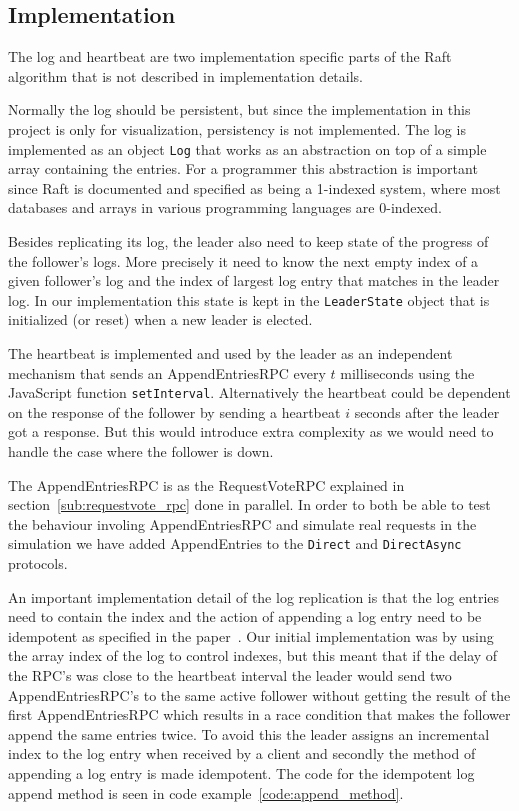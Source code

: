 \subsection{Implementation} %
\label{sub:log_replication_implementation}

The log and heartbeat are two implementation specific parts of the Raft algorithm that is not described in implementation details.

Normally the log should be persistent, but since the implementation in this project is only for visualization, persistency is not implemented. The log is implemented as an object \verb$Log$ that works as an abstraction on top of a simple array containing the entries. For a programmer this abstraction is important since Raft is documented and specified as being a 1-indexed system, where most databases and arrays in various programming languages are 0-indexed.

Besides replicating its log, the leader also need to keep state of the progress of the follower's logs. More precisely it need to know the next empty index of a given follower's log and the index of largest log entry that matches in the leader log. In our implementation this state is kept in the \verb$LeaderState$ object that is initialized (or reset) when a new leader is elected.

The heartbeat is implemented and used by the leader as an independent mechanism that sends an AppendEntriesRPC every $t$ milliseconds using the JavaScript function \verb$setInterval$. Alternatively the heartbeat could be dependent on the response of the follower by sending a heartbeat $i$ seconds after the leader got a response. But this would introduce extra complexity as we would need to handle the case where the follower is down.

The AppendEntriesRPC is as the RequestVoteRPC explained in section~\ref{sub:requestvote_rpc} done in parallel. In order to both be able to test the behaviour involing AppendEntriesRPC and simulate real requests in the simulation we have added AppendEntries to the \verb$Direct$ and \verb$DirectAsync$ protocols.

An important implementation detail of the log replication is that the log entries need to contain the index and the action of appending a log entry need to be idempotent as specified in the paper~\cite[p.~10]{Raft}. Our initial implementation was by using the array index of the log to control indexes, but this meant that if the delay of the RPC's was close to the heartbeat interval the leader would send two AppendEntriesRPC's to the same active follower without getting the result of the first AppendEntriesRPC which results in a race condition that makes the follower append the same entries twice. To avoid this the leader assigns an incremental index to the log entry when received by a client and secondly the method of appending a log entry is made idempotent. The code for the idempotent log append method is seen in code example~\ref{code:append_method}.

